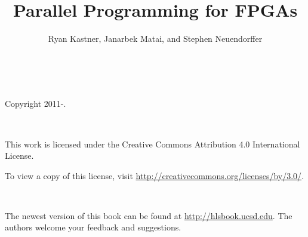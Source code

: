 \documentclass[11pt]{book} %
\title{Parallel Programming for FPGAs}
\author{Ryan Kastner, Janarbek Matai, and Stephen Neuendorffer\\\note{Notes are enabled}}
\newcommand{\note}[1]{}
\begin{document}
\setlength{\emergencystretch}{5em}
\setlength{\fboxrule}{1pt}
\setlength{\fboxsep}{9pt}

\setlength{\FrameRule}{\fboxrule}
\setlength{\FrameSep}{\fboxsep}


\newpage\leavevmode\thispagestyle{empty}\newpage

\maketitle
{} \ \\
\begin{center}
\setlength{\parskip}{0.5\baselineskip}
Copyright 2011-\the\year.
\end{center}
\vspace*{20mm} \ \\
\begin{minipage}{\linewidth}
This work is licensed under the Creative Commons Attribution 4.0 International License.

To view a copy of this license, visit \url{http://creativecommons.org/licenses/by/3.0/}. 
\end{minipage}
\vspace*{20mm} \ \\
\begin{minipage}{\linewidth}
The newest version of this book can be found at \url{http://hlsbook.ucsd.edu}.  The authors welcome your feedback and suggestions.
\end{minipage}
 \ \\
\newpage
\tableofcontents
\newpage















%
%


 
\printnoidxglossaries
\end{document}
